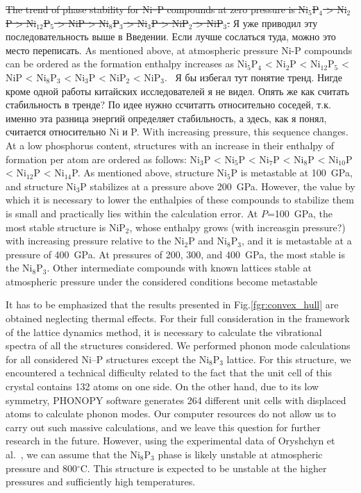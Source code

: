 \documentclass[twoside,twocolumn,9pt]{article}
\begin{document}
\st{The trend of phase stability for Ni--P compounds at zero pressure is Ni$_5$P$_4$ > Ni$_2$P > Ni$_{12}$P$_5$ > NiP > Ni$_8$P$_3$ > Ni$_3$P > NiP$_2$ > NiP$_3$.}
{\color{green} Я уже приводил эту последовательность выше в Введении. Если лучше сослаться туда, можно это место переписать.}
{\color{blue} As mentioned above, at atmospheric pressure Ni-P compounds can be ordered as the formation enthalpy increases as Ni$_5$P$_4$ < Ni$_2$P < Ni$_{12}$P$_5$ < NiP < Ni$_8$P$_3$ < Ni$_3$P < NiP$_2$ < NiP$_3$.}~\cite{Chen-2016-PhaseTrans, Zhao2011-CALPHAD}  
{\color{red} Я бы избегал тут понятие тренд. Нигде кроме одной работы китайских исследователей я не видел. Опять же как считать стабильность в тренде? По идее нужно ссчитатть относительно соседей, т.к. именно эта разница энергий определяет стабильность, а здесь, как я понял, считается относительно Ni и P. }
With increasing pressure, this sequence changes. At a low phosphorus content, structures with an increase in their enthalpy of formation per atom are ordered as follows: Ni$_3$P < Ni$_5$P < Ni$_7$P < Ni$_8$P < Ni$_{10}$P < Ni$_{12}$P < Ni$_{14}$P. 
As mentioned above, structure Ni$_5$P is metastable at 100~GPa, and structure Ni$_3$P stabilizes at a pressure above 200~GPa. 
However, the value by which it is necessary to lower the enthalpies of these compounds to stabilize them is small and practically lies within the calculation error. 
At $P$=100~GPa, the most stable structure is NiP$_2$, whose enthalpy grows {\color{red}(with increasgin pressure?)} {\color{blue} with increasing pressure} relative to the Ni$_2$P and Ni$_8$P$_3$, and it is metastable at a pressure of 400~GPa. 
At pressures of 200, 300, and 400~GPa, the most stable is the Ni$_8$P$_3$. 
Other intermediate compounds with known lattices stable at atmospheric pressure under the considered conditions become metastable

It has to be emphasized that the results presented in Fig.\ref{fgr:convex_hull} are obtained neglecting thermal effects. 
For their full consideration in the framework of the lattice dynamics method, it is necessary to calculate the vibrational spectra of all the structures considered. We performed phonon mode calculations for all considered Ni--P structures except the Ni$_8$P$_3$ lattice. 
For this structure, we encountered a technical difficulty related to the fact that the unit cell of this crystal contains 132 atoms on one side. 
On the other hand, due to its low symmetry, PHONOPY software generates 264 different unit cells with displaced atoms to calculate phonon modes. 
Our computer resources do not allow us to carry out such massive calculations, and we leave this question for further research in the future. 
However, using the experimental data of Oryshchyn et al.~\cite{Oryshchyn-2004}, we can assume that the Ni$_8$P$_3$ phase is likely unstable at atmospheric pressure and 800$^{\circ}$C. 
This structure is expected to be unstable at the higher pressures and  sufficiently high temperatures. 
\end{document}
